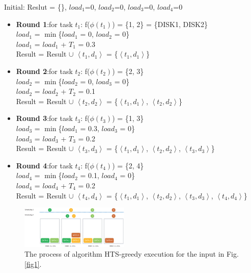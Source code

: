 \documentclass[conference]{IEEEtran}
\begin{document}
Initial: Reslut = \{\}, $load_1$=0, $load_2$=0, $load_3$=0, $load_4$=0
\begin{itemize}
	\item \textbf{Round 1}:for task  $t_1$:
	 f($\phi(t_1)$) = \{1, 2\} = \{DISK1, DISK2\}\\
	 $load_1$ = $\min$\{$load_1$ = 0, $load_2$ = 0\}\\
	 $load_1$ = $load_1$ + $T_1$ = 0.3\\
	Result = Result $\cup$ $\left \langle t_1, d_{1}\right \rangle$ = \{$\left \langle t_1, d_{1}\right \rangle$\}
	\item \textbf{Round 2}:for task  $t_2$:
	f($\phi(t_2)$) = \{2, 3\}\\
	$load_2$ = $\min$\{$load_2$ = 0, $load_3$ = 0\}\\
	$load_2$ = $load_2$ + $T_2$ = 0.1\\
	Result = Result $\cup$ $\left \langle t_2, d_{2}\right \rangle$ = \{$\left \langle t_1, d_{1}\right \rangle$, $\left \langle t_2, d_{2}\right \rangle$\}
	\item \textbf{Round 3}:for task  $t_3$:
	f($\phi(t_3)$) = \{1, 3\}\\
	$load_3$ = $\min$\{$load_1$ = 0.3, $load_3$ = 0\}\\
	$load_3$ = $load_3$ + $T_3$ = 0.2\\
	Result = Result $\cup$ $\left \langle t_3, d_{3}\right \rangle$ = \{$\left \langle t_1, d_{1}\right \rangle$, $\left \langle t_2, d_{2}\right \rangle$,  $\left \langle t_3, d_{3}\right \rangle$\}
	\item \textbf{Round 4}:for task  $t_4$:
	f($\phi(t_4)$) = \{2, 4\}\\
	$load_4$ = $\min$\{$load_2$ = 0.1, $load_4$ = 0\}\\
	$load_4$ = $load_4$ + $T_4$ = 0.2\\
	Result = Result $\cup$ $\left \langle t_4, d_{4}\right \rangle$ = \{$\left \langle t_1, d_{1}\right \rangle$, $\left \langle t_2, d_{2}\right \rangle$,  $\left \langle t_3, d_{3}\right \rangle$, $\left \langle t_4, d_{4}\right \rangle$\}
	
\end{itemize}

\begin{figure}[!t]
	\centering
	\includegraphics[height=0.8in]{fig2.eps}
	\caption{The process of algorithm HTS-greedy execution for the input in Fig.\ref{fig1}. }
	\label{fig2}
\end{figure}
\end{document}
